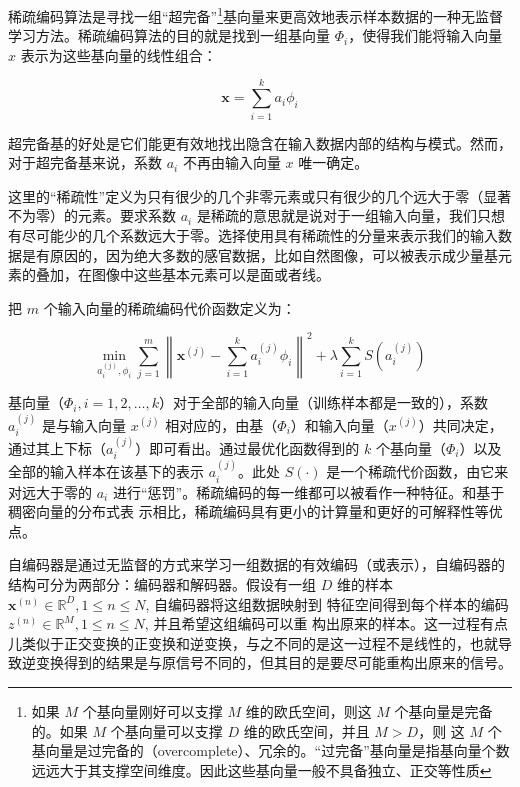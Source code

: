 稀疏编码算法是寻找一组``超完备''\footnote{如果 $M$ 个基向量刚好可以支撑 $M$ 维的欧氏空间，则这 $M$ 个基向量是完备的。如果 $M$ 个基向量可以支撑 $D$ 维的欧氏空间，并且 $M>D$，则 这 $M$ 个基向量是过完备的（overcomplete）、冗余的。“过完备”基向量是指基向量个数远远大于其支撑空间维度。因此这些基向量一般不具备独立、正交等性质
}基向量来更高效地表示样本数据的一种无监督学习方法。稀疏编码算法的目的就是找到一组基向量 $\Phi_i$，使得我们能将输入向量 $x$ 表示为这些基向量的线性组合：

\begin{equation}
\mathbf{x}=\sum_{i=1}^k a_i \phi_i
\end{equation}

超完备基的好处是它们能更有效地找出隐含在输入数据内部的结构与模式。然而，对于超完备基来说，系数 $a_i$ 不再由输入向量 $x$ 唯一确定。

这里的“稀疏性”定义为只有很少的几个非零元素或只有很少的几个远大于零（显著不为零）的元素。要求系数 $a_i$ 是稀疏的意思就是说对于一组输入向量，我们只想有尽可能少的几个系数远大于零。选择使用具有稀疏性的分量来表示我们的输入数据是有原因的，因为绝大多数的感官数据，比如自然图像，可以被表示成少量基元素的叠加，在图像中这些基本元素可以是面或者线。

把 $m$ 个输入向量的稀疏编码代价函数定义为： 

\begin{equation}
\min _{a_i^{(j)}, \phi_i} \sum_{j=1}^m\left\|\mathbf{x}^{(j)}-\sum_{i=1}^k a_i^{(j)} \phi_i\right\|^2+\lambda \sum_{i=1}^k S\left(a_i^{(j)}\right)
\end{equation}

基向量（$\Phi_i,i=1,2,…,k$）对于全部的输入向量（训练样本都是一致的），系数 $a^{(j)}_i$ 是与输入向量 $x^{(j)}$ 相对应的，由基（$\Phi_i$）和输入向量（$x^{(j)}$）共同决定，通过其上下标（$a^{(j)}_i$）即可看出。通过最优化函数得到的 $k$ 个基向量（$\Phi_i$）以及全部的输入样本在该基下的表示 $a^{(j)}_i$。此处 $S(\cdot)$ 是一个稀疏代价函数，由它来对远大于零的 $a_i$ 进行“惩罚”。稀疏编码的每一维都可以被看作一种特征。和基于稠密向量的分布式表 示相比，稀疏编码具有更小的计算量和更好的可解释性等优点。


自编码器是通过无监督的方式来学习一组数据的有效编码（或表示），自编码器的结构可分为两部分：编码器和解码器。假设有一组 $D$ 维的样本 $\boldsymbol{x}^{(n)} \in \mathbb{R}^D, 1 \leq n \leq N$, 自编码器将这组数据映射到 特征空间得到每个样本的编码 $z^{(n)} \in \mathbb{R}^M, 1 \leq n \leq N$, 并且希望这组编码可以重 构出原来的样本。这一过程有点儿类似于正交变换的正变换和逆变换，与之不同的是这一过程不是线性的，也就导致逆变换得到的结果是与原信号不同的，但其目的是要尽可能重构出原来的信号。

